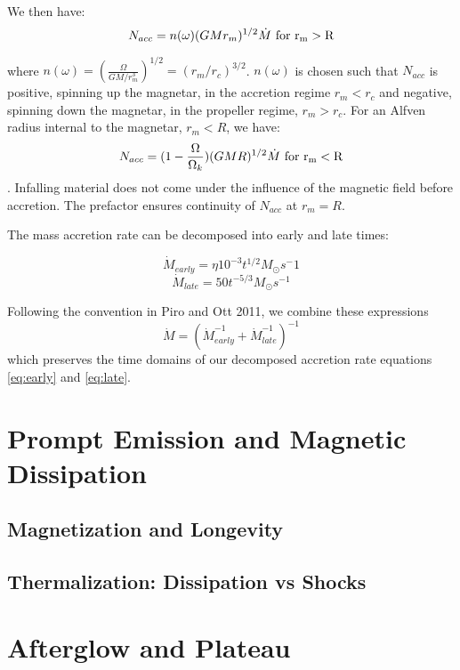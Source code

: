 \documentclass{article}
\begin{document}
We then have:
\begin{equation}
N_{acc}= n(\omega) (GMr_m)^{1/2} \dot{M}\, \,  \rm{for \,\, r_m>R}
\end{equation}

where $n(\omega)=(\frac{\Omega}{GM/r_m^3})^{1/2}=(r_m/r_c)^{3/2}$. $n(\omega)$ is chosen such that $N_{acc}$ is positive, spinning up the magnetar, in the accretion regime $r_m<r_c$ and negative, spinning down the magnetar, in the propeller regime, $r_m>r_c$. For an Alfven radius internal to the magnetar, $r_m<R$, we have:
\begin{equation}
N_{acc}=(1-\frac{\Omega}{\Omega_k})(GMR)^{1/2} \dot{M}\, \,  \rm{for \,\, r_m<R}
\end{equation}.
Infalling material does not come under the influence of the magnetic field before accretion. The prefactor ensures continuity of $N_{acc}$ at $r_m=R$.

The mass accretion rate can be decomposed into early and late times:

\begin{equation} \label{eq:early}
\dot{M}_{early} = \eta 10^{-3}t^{1/2} M_{\odot} s^-1
\end{equation}
\begin{equation} \label{eq:late}
\dot{M}_{late}=50 t^{-5/3}M_{\odot} s^{-1}
\end{equation}

Following the convention in Piro and Ott 2011, we combine these expressions
\begin{equation}
\dot{M}=(\dot{M}_{early}^{-1}+\dot{M}_{late}^{-1})^{-1}
\end{equation}
which preserves the time domains of our decomposed accretion rate equations \ref{eq:early} and \ref{eq:late}.
\section{Prompt Emission and Magnetic Dissipation} \label{sec:prompt}

\subsection{Magnetization and Longevity}

\subsection{Thermalization: Dissipation vs Shocks}

\section{Afterglow and Plateau}
\end{document}
